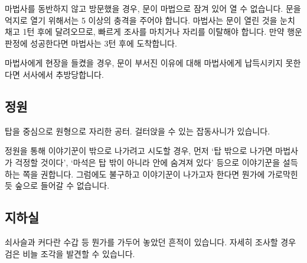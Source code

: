 \documentclass{report}
\begin{document}
		마법사를 동반하지 않고 방문했을 경우, 문이 마법으로 잠겨 있어 열 수 없습니다. 문을 억지로 열기 위해서는 5 이상의 충격을 주어야 합니다. 마법사는 문이 열린 것을 눈치 채고 1턴 후에 달려오므로, 빠르게 조사를 마치거나 자리를 이탈해야 합니다. 만약 행운 판정에 성공한다면 마법사는 3턴 후에 도착합니다.
		
		마법사에게 현장을 들켰을 경우, 문이 부서진 이유에 대해 마법사에게 납득시키지 못한다면 서사에서 추방당합니다.
	
	\subsection*{정원}
		탑을 중심으로 원형으로 자리한 공터. 걸터앉을 수 있는 잡동사니가 있습니다.
		
		정원을 통해 이야기꾼이 밖으로 나가려고 시도할 경우, 먼저 `탑 밖으로 나가면 마법사가 걱정할 것이다', `마석은 탑 밖이 아니라 안에 숨겨져 있다' 등으로 이야기꾼을 설득하는 쪽을 권합니다. 그럼에도 불구하고 이야기꾼이 나가고자 한다면 뭔가에 가로막힌 듯 숲으로 들어갈 수 없습니다.
	
	\subsection*{지하실}
		쇠사슬과 커다란 수갑 등 뭔가를 가두어 놓았던 흔적이 있습니다. 자세히 조사할 경우 \hypertarget{black-scale}{검은 비늘 조각}을 발견할 수 있습니다.
	
\end{document}
